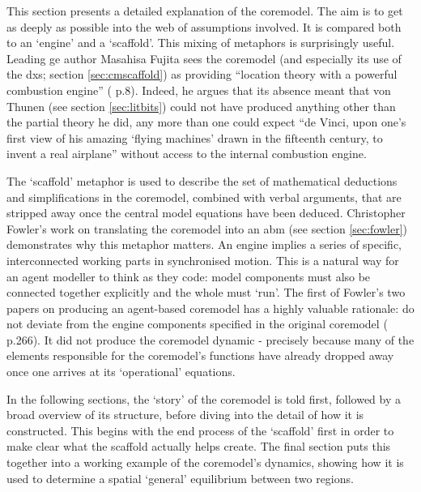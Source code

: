 This section presents a detailed explanation of the \gls{coremodel}. The aim is to get as deeply as possible into the web of assumptions involved. It is compared both to an `engine' and a `scaffold'. This mixing of metaphors is surprisingly useful. Leading \gls{ge} author Masahisa Fujita sees the \gls{coremodel} (and especially its use of the \gls{dxs}; section \ref{sec:cmscaffold}) as providing ``location theory with a powerful combustion engine'' (\citealt{fujita_evolution_2010} p.8). Indeed, he argues that its absence meant that von Thunen (see section \ref{sec:litbits}) could not have produced anything other than the partial theory he did, any more than one could expect ``de Vinci, upon one's first view of his amazing `flying machines' drawn in the fifteenth century, to invent a real airplane'' without access to the internal combustion engine. 

The `scaffold' metaphor is used to describe the set of mathematical deductions and simplifications in the \gls{coremodel}, combined with verbal arguments, that are stripped away once the central model equations have been deduced. Christopher Fowler's work on translating the \gls{coremodel} into an \gls{abm} (see section \ref{sec:fowler}) demonstrates why this metaphor matters. An engine implies a series of specific, interconnected working parts in synchronised motion. This is a natural way for an agent modeller to think as they code: model components must also be connected together explicitly and the whole must `run'. The first of Fowler's two papers on producing an agent-based \gls{coremodel} has a highly valuable rationale: do not deviate from the engine components specified in the original \gls{coremodel} (\citealt{fowler_taking_2007} p.266). It did not produce the \gls{coremodel} dynamic - precisely because many of the elements responsible for the \gls{coremodel}'s functions have already dropped away once one arrives at its `operational' equations.

In the following sections, the `story' of the \gls{coremodel} is told first, followed by a broad overview of its structure, before diving into the detail of how it is constructed. This begins with the end process of the `scaffold' first in order to make clear what the scaffold actually helps create. The final section puts this together into a working example of the \gls{coremodel}'s dynamics, showing how it is used to determine a spatial `general' equilibrium between two regions. 
